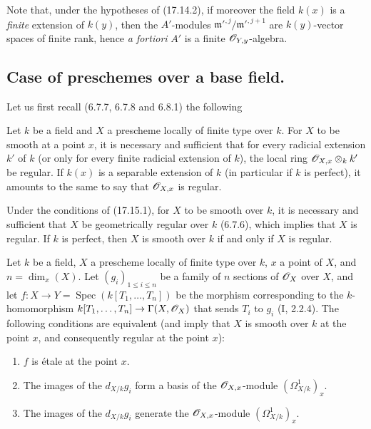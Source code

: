 \begin{remark}[17.14.3]
\label{IV.17.14.3}
Note that, under the hypotheses of (17.14.2), if moreover the field $k(x)$ is a \emph{finite} extension of $k(y)$, then the $A'$-modules $\mathfrak m'^{,j}/\mathfrak m'^{,j+1}$ are $k(y)$-vector spaces of finite rank, hence \emph{a fortiori} $A'$ is a finite $\mathscr{O}_{Y,y}$-algebra.
\end{remark}


\subsection{Case of preschemes over a base field.}

Let us first recall (6.7.7, 6.7.8 and 6.8.1) the following

\begin{proposition}[17.15.1]
\label{IV.17.15.1}
Let $k$ be a field and $X$ a prescheme locally of finite type over $k$. For $X$ to be smooth at a point $x$, it is necessary and sufficient that for every radicial extension $k'$ of $k$ (or only for every finite radicial extension of $k$), the local ring $\mathscr{O}_{X,x}\otimes_k k'$ be regular. If $k(x)$ is a separable extension of $k$ (in particular if $k$ is perfect), it amounts to the same to say that $\mathscr{O}_{X,x}$ is regular.
\end{proposition}

\begin{corollary}[17.15.2]
\label{IV.17.15.2}
Under the conditions of (17.15.1), for $X$ to be smooth over $k$, it is necessary and sufficient that $X$ be geometrically regular over $k$ (6.7.6), which implies that $X$ is regular. If $k$ is perfect, then $X$ is smooth over $k$ if and only if $X$ is regular.
\end{corollary}

\begin{proposition}[17.15.3]
\label{IV.17.15.3}
Let $k$ be a field, $X$ a prescheme locally of finite type over $k$, $x$ a point of $X$, and $n=\dim_x(X)$. Let $(g_i)_{1\leq i\leq n}$ be a family of $n$ sections of $\mathscr{O}_X$ over $X$, and let $f:X\to Y=\operatorname{Spec}(k[T_1,\ldots,T_n])$ be the morphism corresponding to the $k$-homomorphism $k[T_1,\ldots,T_n]\to\Gamma(X,\mathscr{O}_X)$ that sends $T_i$ to $g_i$ (I, 2.2.4). The following conditions are equivalent (and imply that $X$ is smooth over $k$ at the point $x$, and consequently regular at the point $x$):
\begin{enumerate}
  \item[a)] $f$ is étale at the point $x$.
  \item[b)] The images of the $d_{X/k}g_i$ form a basis of the $\mathscr{O}_{X,x}$-module $(\Omega^1_{X/k})_x$.
  \item[c)] The images of the $d_{X/k}g_i$ generate the $\mathscr{O}_{X,x}$-module $(\Omega^1_{X/k})_x$.
\end{enumerate}
\end{proposition}

